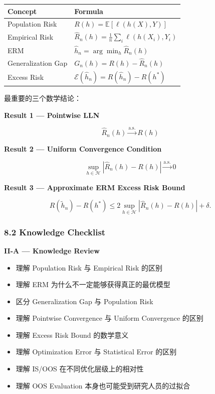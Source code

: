 \begin{readertable}
\begin{longtable}[]{@{}
  >{\raggedright\arraybackslash}p{}
  >{\raggedright\arraybackslash}p{}@{}}
\toprule
Concept & Formula \\
\midrule
\endhead
Population Risk & \(R(h)=\mathbb E[\ell(h(X),Y)]\) \\
Empirical Risk & \(\widehat R_n(h)=\frac1n\sum_i\ell(h(X_i),Y_i)\) \\
ERM & \(\hat h_n=\arg\min_h\widehat R_n(h)\) \\
Generalization Gap & \(G_n(h)=R(h)-\widehat R_n(h)\) \\
Excess Risk & \(\mathcal E(\hat h_n)=R(\hat h_n)-R(h^*)\) \\
\bottomrule
\end{longtable}
\end{readertable}

最重要的三个数学结论：

\textbf{Result 1 --- Pointwise LLN}

\[\widehat R_n(h)
\xrightarrow{\mathrm{a.s.}}R(h)\]

\textbf{Result 2 --- Uniform Convergence Condition}

\[\sup_{h\in\mathcal H}
|\widehat R_n(h)-R(h)|
\xrightarrow{\mathrm{a.s.}}0\]

\textbf{Result 3 --- Approximate ERM Excess Risk Bound}

\[R(\tilde h_n)-R(h^*)
\leq
2\sup_{h\in\mathcal H}
|\widehat R_n(h)-R(h)|+\delta.\]

\hypertarget{part-2-12-0001-knowledge-checklist}{%
\subsubsection{8.2 Knowledge Checklist}\label{part-2-12-0001-knowledge-checklist}}

\textbf{II-A --- Knowledge Review}

\begin{itemize}
\item
  理解 Population Risk 与 Empirical Risk 的区别
\item
  理解 ERM 为什么不一定能够获得真正的最优模型
\item
  区分 Generalization Gap 与 Population Risk
\item
  理解 Pointwise Convergence 与 Uniform Convergence 的区别
\item
  理解 Excess Risk Bound 的数学意义
\item
  理解 Optimization Error 与 Statistical Error 的区别
\item
  理解 IS/OOS 在不同优化层级上的相对性
\item
  理解 OOS Evaluation 本身也可能受到研究人员的过拟合
\end{itemize}


